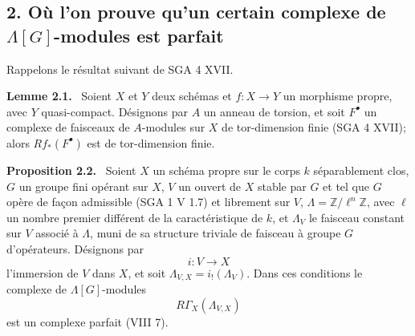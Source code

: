 \documentclass[11pt]{article}
\newenvironment{statement}[1]{\par\medskip\noindent\textbf{#1.}\ }{\par\medskip}
\begin{document}
\subsection*{2. Où l'on prouve qu'un certain complexe de $\Lambda[G]$-modules est parfait}

Rappelons le résultat suivant de SGA 4 XVII.

\begin{statement}{Lemme 2.1}
Soient $X$ et $Y$ deux schémas et $f:X\to Y$ un morphisme propre, avec $Y$ quasi-compact. Désignons par $A$ un anneau de torsion, et soit $F^\bullet$ un complexe de faisceaux de $A$-modules sur $X$ de tor-dimension finie (SGA 4 XVII); alors $Rf_*(F^\bullet)$ est de tor-dimension finie.
\end{statement}

\begin{statement}{Proposition 2.2}
Soient $X$ un schéma propre sur le corps $k$ séparablement clos, $G$ un groupe fini opérant sur $X$, $V$ un ouvert de $X$ stable par $G$ et tel que $G$ opère de façon admissible (SGA 1 V 1.7) et librement sur $V$, $\Lambda=\mathbb Z/\ell^n\mathbb Z$, avec $\ell$ un nombre premier différent de la caractéristique de $k$, et $\Lambda_V$ le faisceau constant sur $V$ associé à $\Lambda$, muni de sa structure triviale de faisceau à groupe $G$ d'opérateurs. Désignons par
\[
i:V\longrightarrow X
\]
l'immersion de $V$ dans $X$, et soit $\Lambda_{V,X}=i_!(\Lambda_V)$. Dans ces conditions le complexe de $\Lambda[G]$-modules
\[
R\Gamma_X(\Lambda_{V,X})
\]
est un complexe parfait (VIII 7).
\end{statement}
\end{document}
